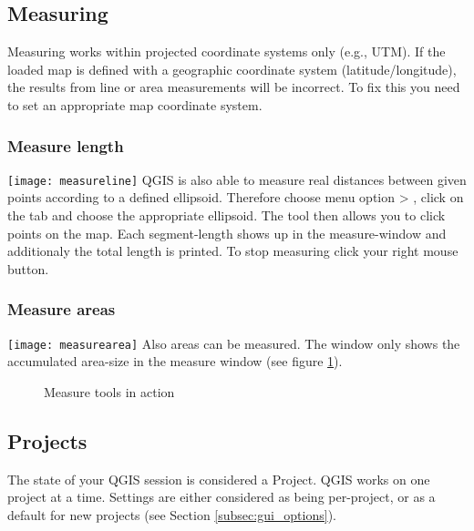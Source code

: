 \subsection{Measuring}\label{sec:measure}

Measuring works within projected coordinate systems only (e.g., UTM). If 
the loaded map is defined with a geographic coordinate system
(latitude/longitude), the results from line or area measurements will be 
incorrect. To fix this you need to set an appropriate map coordinate system.

\subsubsection{Measure length}
\texttt{[image: measureline]} QGIS is also able to measure real distances between given 
points according to a defined ellipsoid. Therefore choose menu option  > , 
click on the  tab and choose the appropriate ellipsoid. The tool then allows you to 
click points on the map. Each segment-length shows up in the measure-window and additionaly the total 
length is printed. To stop measuring click your right mouse button. 

\subsubsection{Measure areas}
\texttt{[image: measurearea]} Also areas can be measured. The window only shows the
accumulated area-size in the measure window (see figure \ref{fig:measure}).

\begin{figure}[h]
\caption{Measure tools in action} \label{fig:measure}
\centering
   \goodgap
\end{figure}

\subsection{Projects}\label{sec:projects}

The state of your QGIS session is considered a Project.  QGIS
works on one project at a time.  Settings are either considered
as being per-project, or as a default for new projects (see
Section \ref{subsec:gui_options}).

